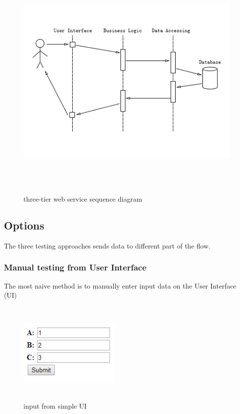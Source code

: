 \documentclass[12pt]{article}
\begin{document}
\begin{figure}[ht!]
\centering
\includegraphics[width=12cm,height=12cm,keepaspectratio]{img/three_tier.jpg}
\caption{three-tier web service sequence diagram}
\label{overflow}
\end{figure}


\subsection{Options}
The three testing approaches sends data to different part of the flow.
\subsubsection{Manual testing from User Interface}
The most naive method is to manually enter input data on the User Interface (UI) \\
		
\begin{figure}[ht!]
\centering
\includegraphics[width=5cm,height=5cm,keepaspectratio]{img/ui.jpg}
\caption{input from simple UI}
\label{overflow}
\end{figure}
\end{document}
